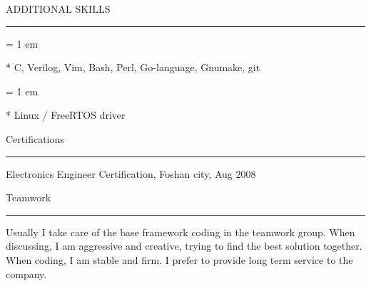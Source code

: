 { \medbreak } { \FFdd
ADDITIONAL SKILLS
}
{ \smallbreak } {\par\noindent\hrule} { \smallbreak }
{ \parindent = 1 em \item{*} 
 C, Verilog, Vim, Bash, Perl, Go-language, Gnumake, git
 }
{ \parindent = 1 em \item{*} 
 Linux / FreeRTOS driver
 }

{ \medbreak } { \FFdd
Certifications
}
{ \smallbreak } {\par\noindent\hrule} { \smallbreak }
Electronics Engineer Certification, Foshan city, Aug 2008

{ \medbreak } { \FFdd
Teamwork
}
{ \smallbreak } {\par\noindent\hrule} { \smallbreak }
Usually I take care of the base framework coding in the teamwork group. When discussing, I am aggressive and creative, trying to find the best solution together. When coding, I am stable and firm. I prefer to provide long term service to the company.

\bye
